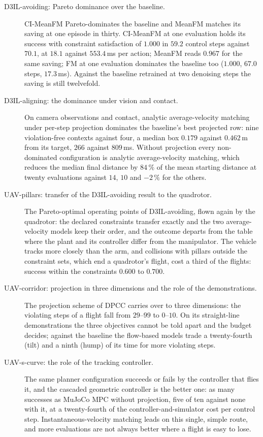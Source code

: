 \begin{description}
  \item[D3IL-avoiding: Pareto dominance over the baseline.] CI-MeanFM Pareto-dominates the baseline and MeanFM
    matches its saving at one episode in thirty. CI-MeanFM at one evaluation holds its success with constraint satisfaction of $1.000$ in $59.2$ control
    steps against $70.1$, at $18.1$ against $553.4$\,ms per action; MeanFM reads $0.967$ for the same saving; FM at one evaluation dominates the baseline too ($1.000$, $67.0$ steps,
    $17.3$\,ms). Against the baseline retrained at two denoising steps the saving is still twelvefold.
  \item[D3IL-aligning: the dominance under vision and contact.] On camera observations and contact, analytic average-velocity
    matching under per-step projection dominates the baseline's best projected row: nine violation-free
    contexts against four, a median box $0.179$ against $0.462$\,m from its target, $266$ against $809$\,ms.
    Without projection every non-dominated configuration is analytic average-velocity matching, which reduces
    the median final distance by $84\,\%$ of the mean starting distance at twenty evaluations against $14$, $10$ and $-2\,\%$ for the others.
  \item[UAV-pillars: transfer of the D3IL-avoiding result to the quadrotor.] The Pareto-optimal operating points
    of D3IL-avoiding, flown again by the quadrotor: the declared constraints transfer exactly and the two
    average-velocity models keep their order, and the outcome departs from the table where the plant and its
    controller differ from the manipulator. The vehicle tracks more closely than the arm, and
    collisions with pillars outside the constraint sets, which end a quadrotor's flight, cost a third of the
    flights: success within the constraints $0.600$ to $0.700$.
  \item[UAV-corridor: projection in three dimensions and the role of the demonstrations.] The projection scheme
    of \ac{DPCC} carries over to three dimensions: the violating steps
    of a flight fall from $29$--$99$ to $0$--$10$. On its straight-line demonstrations the three objectives
    cannot be told apart and the budget decides; against the baseline the flow-based models trade a
    twenty-fourth (tilt) and a ninth (hump) of its time for more violating steps.
  \item[UAV-s-curve: the role of the tracking controller.] The same planner configuration succeeds or fails by the controller that
    flies it, and the cascaded geometric controller is the better one: as many successes as MuJoCo MPC without
    projection, five of ten against none with it, at a twenty-fourth of the controller-and-simulator cost per control step.
    Instantaneous-velocity
    matching leads on this single, simple route, and more evaluations are not always better where a flight
    is easy to lose.
\end{description}

